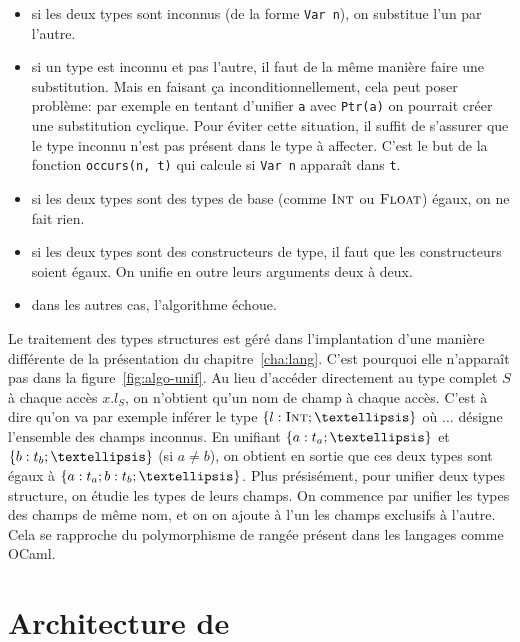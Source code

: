 \begin{itemize}

\item si les deux types sont inconnus (de la forme \texttt{Var n}), on substitue
l'un par l'autre.

\item si un type est inconnu et pas l'autre, il faut de la même manière faire
une substitution.
Mais en faisant ça inconditionnellement, cela peut poser problème:
par exemple en tentant d'unifier \texttt{a} avec \verb!Ptr(a)! on pourrait
créer une substitution cyclique.
Pour éviter cette situation, il suffit de s'assurer que le type inconnu n'est
pas présent dans le type à affecter. C'est le but de la fonction
\texttt{occurs(n, t)} qui calcule si \texttt{Var n} apparaît dans \texttt{t}.

\item si les deux types sont des types de base (comme $\textsc{Int}$ ou $\textsc{Float}$)
égaux, on ne fait rien.

\item si les deux types sont des constructeurs de type, il faut que les
constructeurs soient égaux. On unifie en outre leurs arguments deux à deux.

\item dans les autres cas, l'algorithme échoue.

\end{itemize}

Le traitement des types structures est géré dans l'implantation d'une manière
différente de la présentation du chapitre~\ref{cha:lang}. C'est pourquoi elle
n'apparaît pas dans la figure~\ref{fig:algo-unif}. Au lieu d'accéder directement
au type complet $S$ à chaque accès $x.l_S$, on n'obtient qu'un nom de champ à
chaque accès. C'est à dire qu'on va par exemple inférer le type $\tStruct{ l:
\tInt ; … }$ où $…$ désigne l'ensemble des champs inconnus. En unifiant
$\tStruct{ a: t_a ; … }$ et $\tStruct{ b: t_b ; … }$ (si $a ≠ b$), on obtient
en sortie que ces deux types sont égaux à $\tStruct{ a: t_a; b: t_b ; … }$.
Plus présisément, pour unifier deux types structure, on étudie les types de
leurs champs. On commence par unifier les types des champs de même nom, et on on
ajoute à l'un les champs exclusifs à l'autre. Cela se rapproche du polymorphisme
de rangée présent dans les langages comme OCaml.

\section{Architecture de \ptrtype}
\label{sec:ptrtype-archi}

